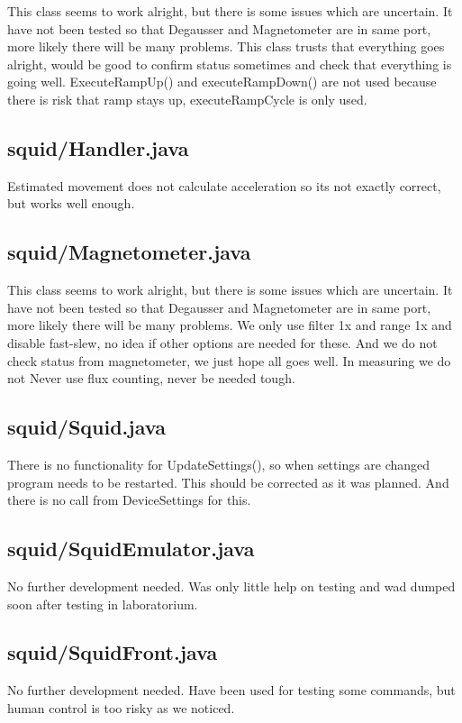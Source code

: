 This class seems to work alright, but there is some issues which are uncertain. It have not been tested so that Degausser and Magnetometer are in same port, more likely there will be many problems. This class trusts that everything goes alright, would be good to confirm status sometimes and check that everything is going well. ExecuteRampUp() and executeRampDown() are not used because there is risk that ramp stays up, executeRampCycle is only used.


\subsection{squid/Handler.java}

Estimated movement does not calculate acceleration so its not exactly correct, but works well enough.


\subsection{squid/Magnetometer.java}

This class seems to work alright, but there is some issues which are uncertain. It have not been tested so that Degausser and Magnetometer are in same port, more likely there will be many problems. We only use filter 1x and range 1x and disable fast-slew, no idea if other options are needed for these. And we do not check status from magnetometer, we just hope all goes well. In measuring we do not Never use flux counting, never be needed tough.


\subsection{squid/Squid.java}

There is no functionality for UpdateSettings(), so when settings are changed program needs to be restarted. This should be corrected as it was planned. And there is no call from DeviceSettings for this.


\subsection{squid/SquidEmulator.java}

No further development needed. Was only little help on testing and wad dumped soon after testing in laboratorium.


\subsection{squid/SquidFront.java}

No further development needed. Have been used for testing some commands, but human control is too risky as we noticed.
